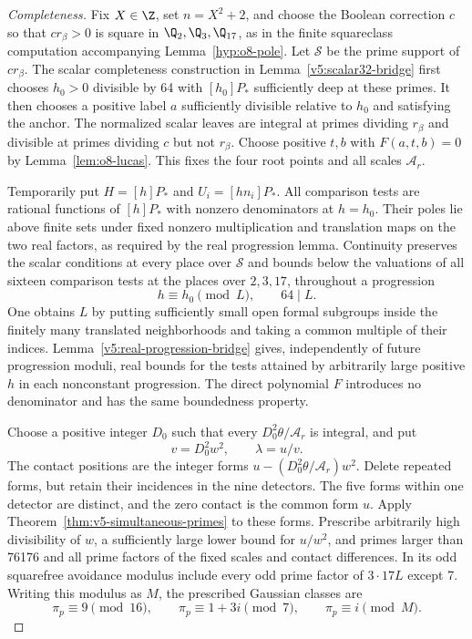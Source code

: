 \begin{proof}[Completeness]
Fix $X\in\Z$, set $n=X^2+2$, and choose the Boolean correction
$c$ so that $cr_\beta>0$ is square in $\Q_2,\Q_3,\Q_{17}$,
as in the finite squareclass computation accompanying
Lemma~\ref{hyp:o8-pole}. Let $\mathcal S$ be the prime support of
$cr_\beta$. The scalar completeness construction in
Lemma~\ref{v5:scalar32-bridge} first chooses $h_0>0$ divisible by
64 with $[h_0]P_*$ sufficiently deep at these primes. It then
chooses a positive label $a$ sufficiently divisible relative to
$h_0$ and satisfying the anchor. The normalized scalar leaves are
integral at primes dividing $r_\beta$ and divisible at primes
dividing $c$ but not $r_\beta$. Choose positive $t,b$ with
$F(a,t,b)=0$ by Lemma~\ref{lem:o8-lucas}.
This fixes the four root points and all scales $\mathcal A_r$.

Temporarily put $H=[h]P_*$ and $U_i=[hn_i]P_*$.
All comparison tests are rational functions of $[h]P_*$ with
nonzero denominators at $h=h_0$. Their poles lie above finite
sets under fixed nonzero multiplication and translation maps
on the two real factors, as required by the real progression lemma.
Continuity preserves the scalar
conditions at every place over $\mathcal S$ and bounds below the
valuations of all sixteen comparison tests at the places over
$2,3,17$, throughout a progression
\[
 h\equiv h_0\pmod L,\qquad64\mid L.
\]
One obtains $L$ by putting sufficiently small open formal subgroups
inside the finitely many translated neighborhoods and taking a
common multiple of their indices. Lemma~\ref{v5:real-progression-bridge}
gives, independently of future progression moduli, real bounds for
the tests attained by arbitrarily large positive $h$ in each
nonconstant progression. The direct polynomial $F$ introduces
no denominator and has the same boundedness property.

Choose a positive integer $D_0$ such that every
$D_0^2\theta/\mathcal A_r$ is integral, and put
\[
 v=D_0^2w^2,\qquad\lambda=u/v.
\]
The contact positions are the integer forms
$u-(D_0^2\theta/\mathcal A_r)w^2$. Delete repeated forms, but retain
their incidences in the nine detectors. The five forms within one
detector are distinct, and the zero contact is the common form $u$.
Apply Theorem~\ref{thm:v5-simultaneous-primes} to these forms.
Prescribe arbitrarily high divisibility of $w$, a sufficiently
large lower bound for $u/w^2$, and primes larger than 76176 and
all prime factors of the fixed scales and contact differences.
In its odd squarefree avoidance modulus include every odd prime
factor of $3\cdot17L$ except 7.
Writing this modulus as $M$, the prescribed Gaussian classes are
\[
 \pi_p\equiv9\pmod{16},\qquad
 \pi_p\equiv1+3i\pmod7,\qquad
 \pi_p\equiv i\pmod M.
\]


\end{proof}
